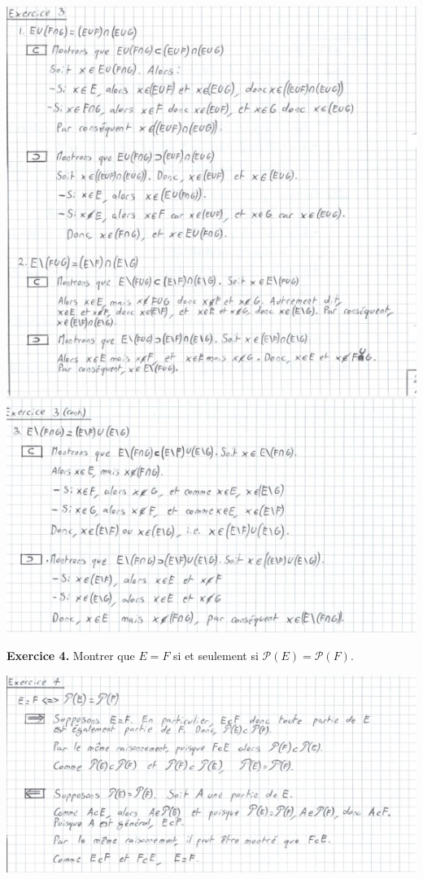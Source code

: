 \documentclass[a4paper, 10pt]{report}
\begin{document}
	
	\includegraphics[scale=0.9]{02B - ex03.jpg}
	
	\newpage
	
	\noindent
	\textbf{Exercice 4.} Montrer que $E = F$ si et seulement si
	$\mathcal{P}(E) = \mathcal{P}(F)$.
	
	\includegraphics{02B - ex04.jpg}
	
\end{document}
